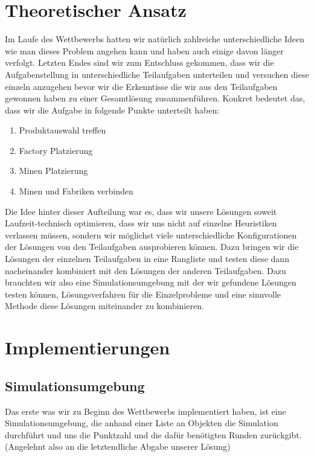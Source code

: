 \documentclass[12pt,a4paper]{article}
\begin{document}
\section{Theoretischer Ansatz}
Im Laufe des Wettbewerbs hatten wir natürlich zahlreiche unterschiedliche Ideen wie man dieses Problem angehen kann und haben auch einige davon länger verfolgt. Letzten Endes sind wir zum Entschluss gekommen, dass wir die Aufgabenstellung in unterschiedliche Teilaufgaben unterteilen und versuchen diese einzeln anzugehen bevor wir die Erkenntisse die wir aus den Teilaufgaben gewonnen haben zu einer Gesamtlösung zusammenführen. Konkret bedeutet das, dass wir die Aufgabe in folgende Punkte unterteilt haben:

\begin{enumerate}
    \item Produktauswahl treffen
    \item Factory Platzierung
    \item Minen Platzierung
    \item Minen und Fabriken verbinden
\end{enumerate}

Die Idee hinter dieser Aufteilung war es, dass wir unsere Lösungen soweit Laufzeit-technisch optimieren, dass wir uns nicht auf einzelne Heuristiken verlassen müssen, sondern wir möglichst viele unterschiedliche Konfigurationen der Lösungen von den Teilaufgaben ausprobieren können. Dazu bringen wir die Lösungen der einzelnen Teilaufgaben in eine Rangliste und testen diese dann nacheinander kombiniert mit den Lösungen der anderen Teilaufgaben. Dazu brauchten wir also eine Simulationsumgebung mit der wir gefundene Lösungen testen können, Lösungsverfahren für die Einzelprobleme und eine sinnvolle Methode diese Lösungen miteinander zu kombinieren.

\newpage

\section{Implementierungen}

\subsection{Simulationsumgebung}
Das erste was wir zu Beginn des Wettbewerbs implementiert haben, ist eine Simulationsumgebung, die anhand einer Liste an Objekten die Simulation durchführt und uns die Punktzahl und die dafür benötigten Runden zurückgibt. (Angelehnt also an die letztendliche Abgabe unserer Lösung)
\end{document}
